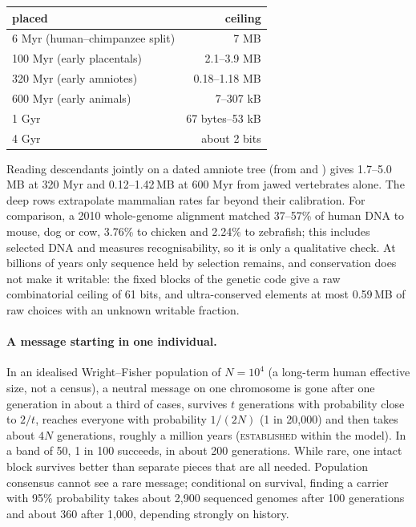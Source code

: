 \documentclass[11pt]{article}
\begin{document}
\begin{center}
\begin{tabular}{lr}
\toprule
placed & ceiling \\
\midrule
6 Myr (human--chimpanzee split) & 7 MB \\
100 Myr (early placentals) & 2.1--3.9 MB \\
320 Myr (early amniotes) & 0.18--1.18 MB \\
600 Myr (early animals) & 7--307 kB \\
1 Gyr & 67 bytes--53 kB \\
4 Gyr & about 2 bits \\
\bottomrule
\end{tabular}
\end{center}

Reading descendants jointly on a dated amniote tree (from \cite{irisarri2017} and \cite{upham2019}) gives 1.7--5.0\,MB at 320 Myr and 0.12--1.42\,MB at 600 Myr from jawed vertebrates alone. The deep rows extrapolate mammalian rates far beyond their calibration. For comparison, a 2010 whole-genome alignment matched 37--57\% of human DNA to mouse, dog or cow, 3.76\% to chicken and 2.24\% to zebrafish; this includes selected DNA and measures recognisability, so it is only a qualitative check. At billions of years only sequence held by selection remains, and conservation does not make it writable: the fixed blocks of the genetic code give a raw combinatorial ceiling of 61 bits, and ultra-conserved elements at most 0.59\,MB of raw choices with an unknown writable fraction.

\paragraph{A message starting in one individual.} In an idealised Wright--Fisher population of $N=10^4$ (a long-term human effective size, not a census), a neutral message on one chromosome is gone after one generation in about a third of cases, survives $t$ generations with probability close to $2/t$, reaches everyone with probability $1/(2N)$ (1 in 20{,}000) and then takes about $4N$ generations, roughly a million years (\textsc{established} within the model). In a band of 50, 1 in 100 succeeds, in about 200 generations. While rare, one intact block survives better than separate pieces that are all needed. Population consensus cannot see a rare message; conditional on survival, finding a carrier with 95\% probability takes about 2{,}900 sequenced genomes after 100 generations and about 360 after 1{,}000, depending strongly on history.
\end{document}
